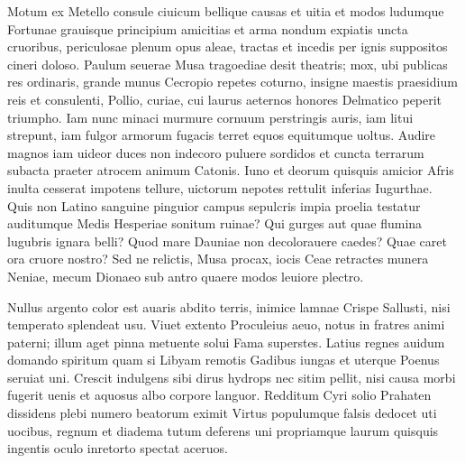 \documentclass{book}
\newenvironment {carmen} [1] [\relax] 
  {\Titulus \Versus \incipit*\numerus{1}#1}
  {\endVersus}
\newcommand {\Sapphic}   {\Forma \strophae {0 \poena 00 \poena 1}}
\newcommand {\Alcaic}    {\Forma \strophae {0 \poena 01 \poena 2}}
\begin{document}
\begin{carmen}[\Alcaic]


Motum ex Metello consule ciuicum
 bellique causas et uitia et modos
      ludumque Fortunae grauisque
      principium amicitias et arma 
nondum expiatis uncta cruoribus,               
 periculosae plenum opus aleae,
      tractas et incedis per ignis
      suppositos cineri doloso. 
Paulum seuerae Musa tragoediae
 desit theatris; mox, ubi publicas               
      res ordinaris, grande munus
      Cecropio repetes coturno, 
insigne maestis praesidium reis
 et consulenti, Pollio, curiae,
      cui laurus aeternos honores
      Delmatico peperit triumpho.                
Iam nunc minaci murmure cornuum
 perstringis auris, iam litui strepunt,
      iam fulgor armorum fugacis
      terret equos equitumque uoltus.                
Audire magnos iam uideor duces
 non indecoro puluere sordidos
      et cuncta terrarum subacta
      praeter atrocem animum Catonis. 
Iuno et deorum quisquis amicior                
Afris inulta cesserat impotens
      tellure, uictorum nepotes
      rettulit inferias Iugurthae. 
Quis non Latino sanguine pinguior
 campus sepulcris impia proelia               
      testatur auditumque Medis
      Hesperiae sonitum ruinae? 
Qui gurges aut quae flumina lugubris
 ignara belli? Quod mare Dauniae
      non decolorauere caedes?
      Quae caret ora cruore nostro?                
Sed ne relictis, Musa procax, iocis
 Ceae retractes munera Neniae,
      mecum Dionaeo sub antro
      quaere modos leuiore plectro.                

\end{carmen}

\begin{carmen}[\Sapphic]


Nullus argento color est auaris
 abdito terris, inimice lamnae
 Crispe Sallusti, nisi temperato
      splendeat usu. 
Viuet extento Proculeius aeuo,               
 notus in fratres animi paterni;
 illum aget pinna metuente solui
      Fama superstes. 
Latius regnes auidum domando
 spiritum quam si Libyam remotis               
 Gadibus iungas et uterque Poenus
      seruiat uni. 
Crescit indulgens sibi dirus hydrops
 nec sitim pellit, nisi causa morbi
 fugerit uenis et aquosus albo               
      corpore languor. 
Redditum Cyri solio Prahaten
 dissidens plebi numero beatorum
 eximit Virtus populumque falsis
      dedocet uti                
uocibus, regnum et diadema tutum
 deferens uni propriamque laurum
 quisquis ingentis oculo inretorto
      spectat aceruos. 

\end{carmen}
\end{document}
